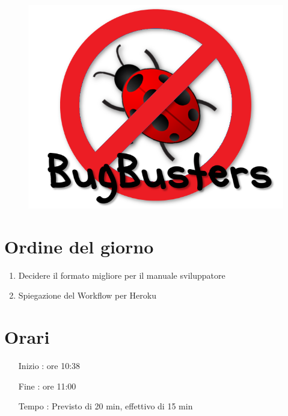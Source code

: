 \documentclass[11pt]{meetingmins}
\begin{document}
\begin{figure}[H]

  \centering
  \includegraphics[scale=0.45]{../../common/style/logo.png}
\end{figure}
\maketitle

\section{Ordine del giorno}

\begin{enumerate}

\item Decidere il formato migliore per il manuale sviluppatore
\item Spiegazione del Workflow per Heroku
\end{enumerate}

\section{Orari}

\begin{itemize}
\item[Inizio]: ore 10:38
\item[Fine]: ore 11:00
\item[Tempo]: Previsto di 20 min, effettivo di 15 min

\end{itemize}
\end{document}
